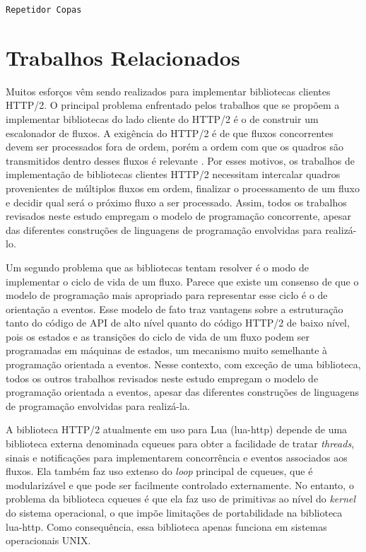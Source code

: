 \begin{center}
 \begin{minipage}{0.7\textwidth}
  \begin{codigo}[H]
   \small
   \caption{\texttt{Repetidor Copas}}
   \label{code:repetidor}
  \end{codigo}
 \end{minipage}
\end{center}

\section{Trabalhos Relacionados}
\label{sec:relatedwork}

Muitos esforços vêm sendo realizados para implementar bibliotecas clientes HTTP/2. O principal problema enfrentado pelos trabalhos que se propõem a implementar bibliotecas do lado cliente do HTTP/2 é o de construir um escalonador de fluxos. A exigência do HTTP/2 é de que fluxos concorrentes devem ser processados fora de ordem, porém a ordem com que os quadros são transmitidos dentro desses fluxos é relevante \cite{BelsheRFC7540}. Por esses motivos, os trabalhos de implementação de bibliotecas clientes HTTP/2 necessitam intercalar quadros provenientes de múltiplos fluxos em ordem, finalizar o processamento de um fluxo e decidir qual será o próximo fluxo a ser processado. Assim, todos os trabalhos revisados neste estudo empregam o modelo de programação concorrente, apesar das diferentes construções de linguagens de programação envolvidas para realizá-lo.

Um segundo problema que as bibliotecas tentam resolver é o modo de implementar o ciclo de vida de um fluxo. Parece que existe um consenso de que o modelo de programação mais apropriado para representar esse ciclo é o de orientação a eventos. Esse modelo de fato traz vantagens sobre a estruturação tanto do código de API de alto nível quanto do código HTTP/2 de baixo nível, pois os estados e as transições do ciclo de vida de um fluxo podem ser programadas em máquinas de estados, um mecanismo muito semelhante à programação orientada a eventos. Nesse contexto, com exceção de uma biblioteca, todos os outros trabalhos revisados neste estudo empregam o modelo de programação orientada a eventos, apesar das diferentes construções de linguagens de programação envolvidas para realizá-la.

A biblioteca HTTP/2 atualmente em uso para Lua (lua-http) \cite{DaurminatorLuaHTTP} depende de uma biblioteca externa denominada cqueues para obter a facilidade de tratar {\em threads}, sinais e notificações para implementarem concorrência e eventos associados aos fluxos. Ela também faz uso extenso do {\em loop} principal de cqueues, que é modularizável e que pode ser facilmente controlado externamente. No entanto, o problema da biblioteca cqueues é que ela faz uso de primitivas ao nível do {\em kernel} do sistema operacional, o que impõe limitações de portabilidade na biblioteca lua-http. Como consequência, essa biblioteca apenas funciona em sistemas operacionais UNIX.

